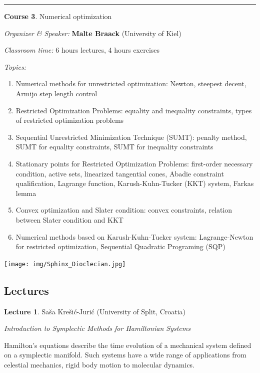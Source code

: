 \documentclass[
]{article}
\providecommand{\tightlist}{%
  \setlength{\itemsep}{0pt}\setlength{\parskip}{0pt}}
\begin{document}
\begin{center}\rule{0.5\linewidth}{0.5pt}\end{center}

\textbf{Course 3}. Numerical optimization

\emph{Organizer \& Speaker:} \textbf{Malte Braack} (University of Kiel)

\emph{Classroom time:} \textbf{} 6 hours lectures, 4 hours exercises

\emph{Topics:} \textbf{}

\begin{enumerate}
\tightlist
\item
  Numerical methods for unrestricted optimization: Newton, steepest
  decent, Armijo step length control
\item
  Restricted Optimization Problems: equality and inequality constraints,
  types of restricted optimization problems
\item
  Sequential Unrestricted Minimization Technique (SUMT): penalty method,
  SUMT for equality constraints, SUMT for inequality constraints
\item
  Stationary points for Restricted Optimization Problems: first-order
  necessary condition, active sets, linearized tangential cones, Abadie
  constraint qualification, Lagrange function, Karush-Kuhn-Tucker (KKT)
  system, Farkas lemma
\item
  Convex optimization and Slater condition: convex constraints, relation
  between Slater condition and KKT
\item
  Numerical methods based on Karush-Kuhn-Tucker system: Lagrange-Newton
  for restricted optimization, Sequential Quadratic Programing (SQP)
\end{enumerate}

\hypertarget{lectures}{}
\texttt{[image: img/Sphinx\_Dioclecian.jpg]}

\hypertarget{lectures}{%
\subsection{Lectures}\label{lectures}}

\textbf{Lecture 1}. Saša Krešić-Jurić (University of Split, Croatia)

\emph{Introduction to Symplectic Methods for Hamiltonian Systems}

Hamilton's equations describe the time evolution of a mechanical system
defined on a symplectic manifold. Such systems have a wide range of
applications from celestial mechanics, rigid body motion to molecular
dynamics.
\end{document}
